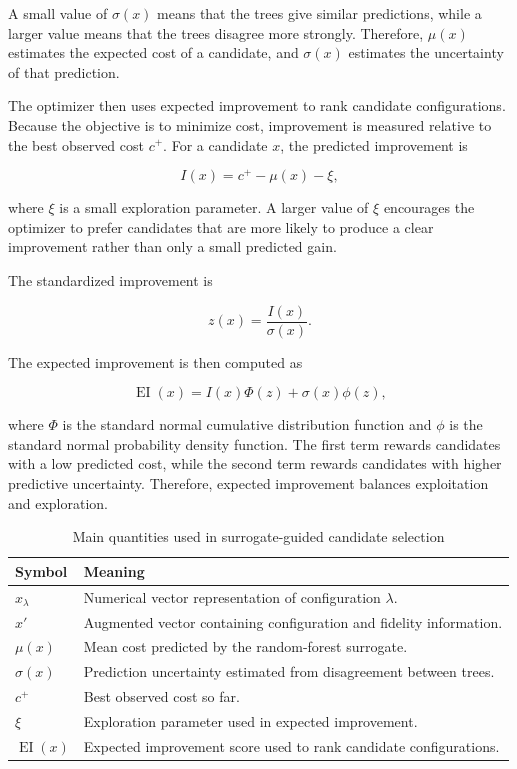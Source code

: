 \documentclass[12pt,a4paper]{report}
\begin{document}
\noindent A small value of \(\sigma(x)\) means that the trees give similar predictions,
while a larger value means that the trees disagree more strongly. Therefore,
\(\mu(x)\) estimates the expected cost of a candidate, and \(\sigma(x)\)
estimates the uncertainty of that prediction.

\noindent The optimizer then uses expected improvement to rank candidate configurations.
Because the objective is to minimize cost, improvement is measured relative to
the best observed cost \(c^+\). For a candidate \(x\), the predicted improvement
is

\[
I(x) = c^+ - \mu(x) - \xi,
\]

\noindent where \(\xi\) is a small exploration parameter. A larger value of \(\xi\)
encourages the optimizer to prefer candidates that are more likely to produce a
clear improvement rather than only a small predicted gain.

\noindent The standardized improvement is

\[
z(x) =
\frac{I(x)}{\sigma(x)}.
\]

\noindent The expected improvement is then computed as

\[
\operatorname{EI}(x) =
I(x)\Phi(z)
+
\sigma(x)\phi(z),
\]

\noindent where \(\Phi\) is the standard normal cumulative distribution function and
\(\phi\) is the standard normal probability density function. The first term
rewards candidates with a low predicted cost, while the second term rewards
candidates with higher predictive uncertainty. Therefore, expected improvement
balances exploitation and exploration.

\begin{table}[H]
\centering
\caption{Main quantities used in surrogate-guided candidate selection}
\label{tab:gp-automl-surrogate-quantities}
\renewcommand{\arraystretch}{1.2}
\begin{tabular}{p{}p{}}
\toprule
\textbf{Symbol} & \textbf{Meaning} \\
\midrule
\(x_{\lambda}\) &
Numerical vector representation of configuration \(\lambda\). \\

\(x'\) &
Augmented vector containing configuration and fidelity information. \\

\(\mu(x)\) &
Mean cost predicted by the random-forest surrogate. \\

\(\sigma(x)\) &
Prediction uncertainty estimated from disagreement between trees. \\

\(c^+\) &
Best observed cost so far. \\

\(\xi\) &
Exploration parameter used in expected improvement. \\

\(\operatorname{EI}(x)\) &
Expected improvement score used to rank candidate configurations. \\
\bottomrule
\end{tabular}
\end{table}
\end{document}
